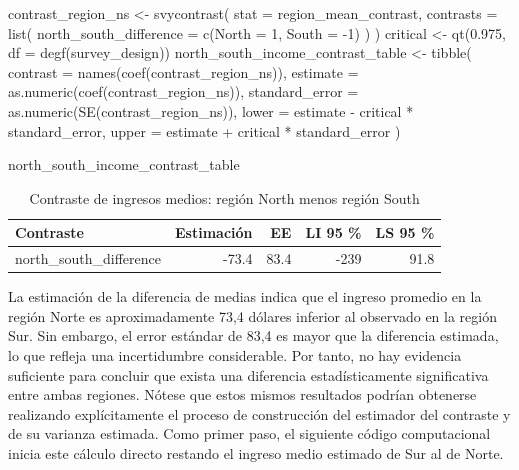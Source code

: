 \documentclass[
  spanish,
  11pt,
  letterpaper,
  oneside,
  open=any]{scrbook}
\newenvironment{Shaded}{\begin{snugshade}}{\end{snugshade}}
\newcommand{\AttributeTok}[1]{\textcolor[rgb]{0.40,0.45,0.13}{#1}}
\newcommand{\DecValTok}[1]{\textcolor[rgb]{0.68,0.00,0.00}{#1}}
\newcommand{\FloatTok}[1]{\textcolor[rgb]{0.68,0.00,0.00}{#1}}
\newcommand{\FunctionTok}[1]{\textcolor[rgb]{0.28,0.35,0.67}{#1}}
\newcommand{\NormalTok}[1]{\textcolor[rgb]{0.00,0.23,0.31}{#1}}
\newcommand{\OtherTok}[1]{\textcolor[rgb]{0.00,0.23,0.31}{#1}}
\newcommand{\SpecialCharTok}[1]{\textcolor[rgb]{0.37,0.37,0.37}{#1}}
\begin{document}
\begin{Shaded}
\begin{Highlighting}[]
\NormalTok{contrast\_region\_ns }\OtherTok{\textless{}{-}} \FunctionTok{svycontrast}\NormalTok{(}
  \AttributeTok{stat =}\NormalTok{ region\_mean\_contrast,}
  \AttributeTok{contrasts =} \FunctionTok{list}\NormalTok{(}
    \AttributeTok{north\_south\_difference =} \FunctionTok{c}\NormalTok{(}\AttributeTok{North =} \DecValTok{1}\NormalTok{, }\AttributeTok{South =} \SpecialCharTok{{-}}\DecValTok{1}\NormalTok{)}
\NormalTok{  )}
\NormalTok{)}
\NormalTok{critical }\OtherTok{\textless{}{-}} \FunctionTok{qt}\NormalTok{(}\FloatTok{0.975}\NormalTok{, }\AttributeTok{df =} \FunctionTok{degf}\NormalTok{(survey\_design))}
\NormalTok{north\_south\_income\_contrast\_table }\OtherTok{\textless{}{-}} \FunctionTok{tibble}\NormalTok{(}
  \AttributeTok{contrast =} \FunctionTok{names}\NormalTok{(}\FunctionTok{coef}\NormalTok{(contrast\_region\_ns)),}
  \AttributeTok{estimate =} \FunctionTok{as.numeric}\NormalTok{(}\FunctionTok{coef}\NormalTok{(contrast\_region\_ns)),}
  \AttributeTok{standard\_error =} \FunctionTok{as.numeric}\NormalTok{(}\FunctionTok{SE}\NormalTok{(contrast\_region\_ns)),}
  \AttributeTok{lower =}\NormalTok{ estimate }\SpecialCharTok{{-}}\NormalTok{ critical }\SpecialCharTok{*}\NormalTok{ standard\_error,}
  \AttributeTok{upper =}\NormalTok{ estimate }\SpecialCharTok{+}\NormalTok{ critical }\SpecialCharTok{*}\NormalTok{ standard\_error}
\NormalTok{)}

\NormalTok{north\_south\_income\_contrast\_table}
\end{Highlighting}
\end{Shaded}

{

\begin{longtable}[]{@{}lrrrr@{}}

\caption{\label{tbl-contraste-ns}Contraste de ingresos medios: región
North menos región South}

\tabularnewline

\toprule\noalign{}
Contraste & Estimación & EE & LI 95 \% & LS 95 \% \\
\midrule\noalign{}
\endhead
\bottomrule\noalign{}
\endlastfoot
north\_south\_difference & -73.4 & 83.4 & -239 & 91.8 \\

\end{longtable}

}

La estimación de la diferencia de medias indica que el ingreso promedio
en la región Norte es aproximadamente 73,4 dólares inferior al observado
en la región Sur. Sin embargo, el error estándar de 83,4 es mayor que la
diferencia estimada, lo que refleja una incertidumbre considerable. Por
tanto, no hay evidencia suficiente para concluir que exista una
diferencia estadísticamente significativa entre ambas regiones. Nótese
que estos mismos resultados podrían obtenerse realizando explícitamente
el proceso de construcción del estimador del contraste y de su varianza
estimada. Como primer paso, el siguiente código computacional inicia
este cálculo directo restando el ingreso medio estimado de Sur al de
Norte.
\end{document}
